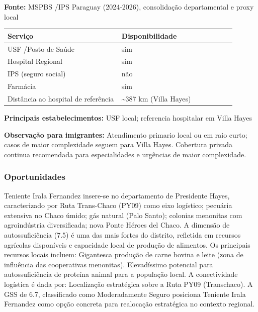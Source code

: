 \textbf{Fonte:} MSPBS /\allowbreak  IPS Paraguay (2024-2026), consolidação
departamental e proxy local

{\def\LTcaptype{none} %
\begin{longtable}{@{}>{\raggedright\arraybackslash}p{0.45\linewidth} >{\raggedright\arraybackslash}p{0.45\linewidth}@{}}
\toprule\noalign{}
Serviço & Disponibilidade \\
\midrule\noalign{}
\endhead
\bottomrule\noalign{}
\endlastfoot
USF /\allowbreak  Posto de Saúde & sim \\
Hospital Regional & sim \\
IPS (seguro social) & não \\
Farmácia & sim \\
Distância ao hospital de referência & \textasciitilde387 km (Villa
Hayes) \\
\end{longtable}
}

\textbf{Principais estabelecimentos:} USF local; referencia hospitalar
em Villa Hayes

\textbf{Observação para imigrantes:} Atendimento primario local ou em
raio curto; casos de maior complexidade seguem para Villa Hayes.
Cobertura privada continua recomendada para especialidades e urgências
de maior complexidade.
\newpage

\subsubsection*{Oportunidades}\label{oport-teniente-irala-fernandez-1509}
Teniente Irala Fernandez insere-se no departamento de Presidente Hayes, caracterizado por Ruta Trans-Chaco (PY09) como eixo logístico; pecuária extensiva no Chaco úmido; gás natural (Palo Santo); colonias menonitas com agroindústria diversificada; nova Ponte Héroes del Chaco. A dimensão de autossuficiência (7.5) é uma das mais fortes do distrito, refletida em recursos agrícolas disponíveis e capacidade local de produção de alimentos. Os principais recursos locais incluem: Gigantesca produção de carne bovina e leite (zona de influência das cooperativas menonitas). Elevadíssimo potencial para autossuficiência de proteína animal para a população local. A conectividade logística é dada por: Localização estratégica sobre a Ruta PY09 (Transchaco). A GSS de 6.7, classificado como Moderadamente Seguro posiciona Teniente Irala Fernandez como opção concreta para realocação estratégica no contexto regional.

